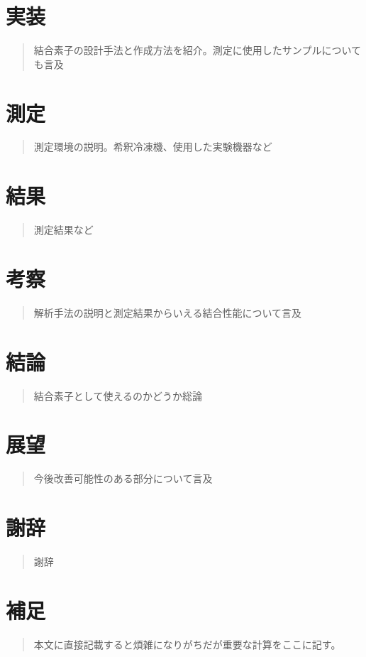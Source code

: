 \documentclass[uplatex,openany,oneside,a4j,11pt]{jsbook}
\begin{document}
\chapter{実装}
    \begin{abstract}
        結合素子の設計手法と作成方法を紹介。測定に使用したサンプルについても言及
    \end{abstract}
    

\chapter{測定}
    \begin{abstract}
        測定環境の説明。希釈冷凍機、使用した実験機器など
    \end{abstract}
    

\chapter{結果}
    \begin{abstract}
        測定結果など
    \end{abstract}
    

\chapter{考察}
    \begin{abstract}
        解析手法の説明と測定結果からいえる結合性能について言及
    \end{abstract}
    

\chapter{結論}
    \begin{abstract}
        結合素子として使えるのかどうか総論
    \end{abstract}
    

\chapter{展望}
    \begin{abstract}
        今後改善可能性のある部分について言及
    \end{abstract}
    

\chapter{謝辞}
    \begin{abstract}
        謝辞
    \end{abstract}
    

\chapter{補足}
    \begin{abstract}
        本文に直接記載すると煩雑になりがちだが重要な計算をここに記す。
    \end{abstract}
    


%
\printbibliography[title=参考文献]
\end{document}

